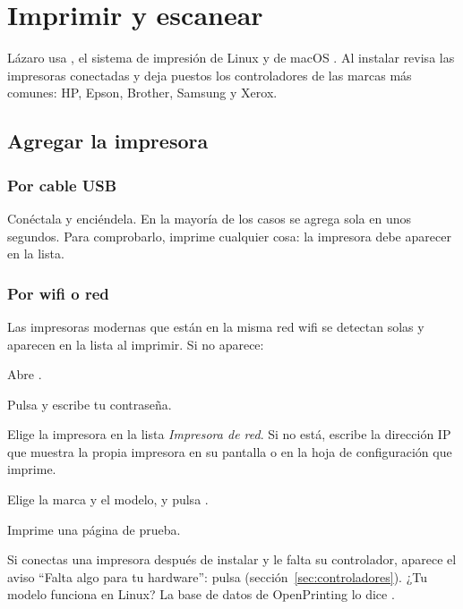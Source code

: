 \chapter{Imprimir y escanear}\label{cap:12-imprimir}

Lázaro usa , el sistema de impresión de Linux y de macOS
\cite{cups}. Al instalar revisa las impresoras conectadas y deja puestos
los controladores de las marcas más comunes: HP, Epson, Brother, Samsung y
Xerox.

\section{Agregar la impresora}

\subsection{Por cable USB}
Conéctala y enciéndela. En la mayoría de los casos se agrega sola en
unos segundos. Para comprobarlo, imprime cualquier cosa: la impresora
debe aparecer en la lista.

\subsection{Por wifi o red}
Las impresoras modernas que están en la misma red wifi se detectan solas
y aparecen en la lista al imprimir. Si no aparece:
\begin{pasos}
  \item Abre .
  \item Pulsa  y escribe tu contraseña.
  \item Elige la impresora en la lista \emph{Impresora de red}. Si no
        está, escribe la dirección IP que muestra la propia impresora en su
        pantalla o en la hoja de configuración que imprime.
  \item Elige la marca y el modelo, y pulsa .
  \item Imprime una página de prueba.
\end{pasos}


\begin{consejo}
Si conectas una impresora después de instalar y le falta su controlador,
aparece el aviso \enquote{Falta algo para tu hardware}: pulsa
 (sección~\ref{sec:controladores}). ¿Tu modelo funciona en
Linux? La base de datos de OpenPrinting lo dice \cite{openprinting}.
\end{consejo}


